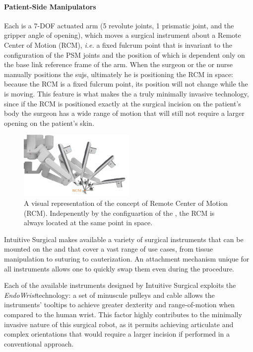 \documentclass[../main.tex]{subfiles}
\begin{document}
\paragraph{Patient-Side Manipulators} Each \psm is a 7-DOF actuated arm (5 revolute joints, 1 prismatic joint, and the gripper angle of opening), which moves a surgical instrument about a Remote Center of Motion (RCM), \textit{i.e.} a fixed fulcrum point that is invariant to the configuration of the PSM joints and the position of which is dependent only on the base link reference frame of the arm. When the surgeon or the \ac{or} nurse manually positions the \acp{suj}, ultimately he is positioning the RCM in space: because the RCM is a fixed fulcrum point, its position will not change while the \psm is moving. This feature is what makes the \davinci a truly minimally invasive technology, since if the RCM is positioned exactly at the surgical incision on the patient's body the surgeon has a wide range of motion that will still not require a larger opening on the patient's skin. 

\begin{figure}[h!]
    \centering
    \includegraphics[width=0.5\textwidth]{images/rcm.jpg}
    \caption{A visual representation of the concept of Remote Center of Motion (RCM). Indepenently by the configuartion of the \psm, the RCM is always located at the same point in space.}
    \label{fig:rcm}
\end{figure}

Intuitive Surgical makes available a variety of surgical instruments that can be mounted on the \psms and that cover a vast range of use cases, from tissue manipulation to suturing to cauterization. An attachment mechanism unique for all instruments allows one to quickly swap them even during the procedure.

Each of the available instruments designed by Intuitive Surgical exploits the \textit{EndoWrist}\cright technology: a set of minuscule pulleys and cable allows the instruments' tooltips to achieve greater dexterity and range-of-motion when compared to the human wrist. This factor highly contributes to the minimally invasive nature of this surgical robot, as it permits achieving articulate and complex orientations that would require a larger incision if performed in a conventional approach.
\end{document}
